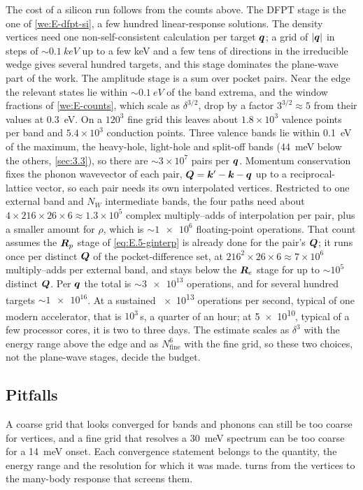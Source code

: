 The cost of a silicon run follows from the counts above. The DFPT stage is the one of \cref{we:E-dfpt-si}, a few hundred linear-response solutions. The density vertices need one non-self-consistent calculation per target $\bm{q}$; a grid of $|\bm{q}|$ in steps of $\sim\SI{0.1}{keV}$ up to a few keV and a few tens of directions in the irreducible wedge gives several hundred targets, and this stage dominates the plane-wave part of the work. The amplitude stage is a sum over pocket pairs. Near the edge the relevant states lie within $\sim\SI{0.1}{eV}$ of the band extrema, and the window fractions of \cref{we:E-counts}, which scale as $\delta^{3/2}$, drop by a factor $3^{3/2} \approx 5$ from their values at \SI{0.3}{eV}. On a $120^3$ fine grid this leaves about $1.8\times10^3$ valence points per band and $5.4\times10^3$ conduction points. Three valence bands lie within \SI{0.1}{eV} of the maximum, the heavy-hole, light-hole and split-off bands (\SI{44}{meV} below the others, \cref{sec:3.3}), so there are $\sim3\times10^7$ pairs per $\bm{q}$. Momentum conservation fixes the phonon wavevector of each pair, $\bm{Q} = \bm{k}' - \bm{k} - \bm{q}$ up to a reciprocal-lattice vector, so each pair needs its own interpolated vertices. Restricted to one external band and $N_W$ intermediate bands, the four paths need about $4\times216\times26\times6 \approx 1.3\times10^5$ complex multiply--adds of interpolation per pair, plus a smaller amount for $\rho$, which is $\sim\num{1e6}$ floating-point operations. That count assumes the $\bm{R}_p$ stage of \cref{eq:E.5-ginterp} is already done for the pair's $\bm{Q}$; it runs once per distinct $\bm{Q}$ of the pocket-difference set, at $216^2\times26\times6 \approx 7\times10^6$ multiply--adds per external band, and stays below the $\bm{R}_e$ stage for up to $\sim10^5$ distinct $\bm{Q}$. Per $\bm{q}$ the total is $\sim\num{3e13}$ operations, and for several hundred targets $\sim\num{1e16}$. At a sustained \num{e13} operations per second, typical of one modern accelerator, that is $10^3$\,s, a quarter of an hour; at \num{5e10}, typical of a few processor cores, it is two to three days. The estimate scales as $\delta^{3}$ with the energy range above the edge and as $N_{\mathrm{fine}}^6$ with the fine grid, so these two choices, not the plane-wave stages, decide the budget.

\subsection{Pitfalls}

A coarse grid that looks converged for bands and phonons can still be too coarse for vertices, and a fine grid that resolves a \SI{30}{meV} spectrum can be too coarse for a \SI{14}{meV} onset. Each convergence statement belongs to the quantity, the energy range and the resolution for which it was made.  turns from the vertices to the many-body response that screens them.
